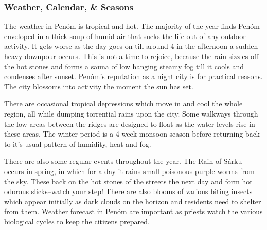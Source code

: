 \subsubsection{Weather, Calendar, \& Seasons}

The weather in Penóm is tropical and hot. The majority of the year finds Penóm enveloped in a thick soup of humid air that sucks the life out of any outdoor activity. It gets worse as the day goes on till around 4 in the afternoon a sudden heavy downpour occurs. This is not a time to rejoice, because the rain  sizzles off the hot stones and forms a sauna of low hanging steamy fog till it cools and condenses after sunset. Penóm's reputation as a night city is for practical reasons. The city blossoms into activity the moment the sun has set.

There are occasional tropical depressions which move in and cool the whole region, all while dumping torrential rains upon the city. Some walkways through the low areas between the ridges are designed to float as the water levels rise in these areas. The winter period is a 4 week monsoon season before returning back to it's usual pattern of humidity, heat and fog.

There are also some regular events throughout the year. The Rain of Sárku occurs in spring, in which for a day it rains small poisonous purple worms from the sky. These back on the hot stones of the streets the next day and form hot odorous slicks--watch your step! There are also blooms of various biting insects which appear initially as dark clouds on the horizon and residents need to shelter from them. Weather forecast in Penóm are important as priests watch the various biological cycles to keep the citizens prepared.

